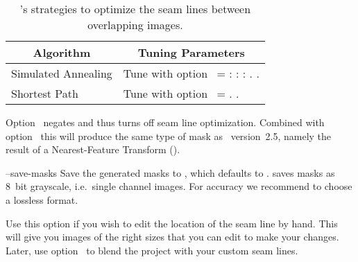 \begin{codelist}
  \begin{table}[htbp]
    \begin{tabular}{p{.35\linewidth}p{.55\linewidth}}
      \hline
      \multicolumn{1}{c|}{Algorithm} &
      \multicolumn{1}{c}{Tuning Parameters} \\
      \hline\extraheadingsep
      Simulated Annealing & Tune with
      option~\option{--anneal} = \metavar{TAU} : \metavar{DELTA-E-MAX} :
      \metavar{DELTA-E-MIN} : \metavar{K-MAX}.
      \uref{\wikipediasimulatedannealing}{Simulated-Annealing}.
      \fixme{Explain Simulated-Annealing!} \\
      \propername{Dijkstra} Shortest Path & Tune with
      option~\option{--dijkstra} = \metavar{RADIUS}.
      \uref{\wikipediadijkstraalgorithm}{\propername{Dijkstra} algorithm}.
      \fixme{Explain \propername{Dijkstra} algorithm!}
    \end{tabular}

    \caption[Optimizer strategies]%
            {\App{}'s strategies to optimize the seam lines between
              overlapping images.\label{tab:optimizer-strategies}}

  \end{table}

  Option~
  negates %
   and
  thus turns off seam line optimization.  Combined with
  option~ this will produce the same type of mask
  as \App{}~version~2.5, namely the result of a Nearest-Feature
  Transform ().


  \label{opt:save-masks}%
\item[--save-masks\optional{=\metavar{IMAGE-TEMPLATE}}]\itemend
  Save the generated
  masks to , which defaults to
  \mbox{}.  \App{} saves masks
  as 8~bit grayscale, i.e.\ single channel images.  For accuracy we
  recommend to choose a lossless format.

  Use this option if you wish to edit the location of the seam line by
  hand.  This will give you images of the right sizes that you can
  edit to make your changes.  Later, use option~
  to blend the project with your custom seam lines.


\end{codelist}
